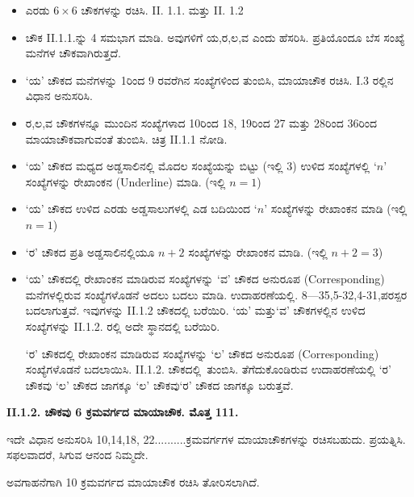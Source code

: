 \begin{itemize}
	\item ಎರಡು $6 \times 6$ ಚೌಕಗಳನ್ನು ರಚಿಸಿ. II. 1.1. ಮತ್ತು II. 1.2
	\item ಚೌಕ II.1.1.ನ್ನು 4 ಸಮಭಾಗ ಮಾಡಿ. ಅವುಗಳಿಗೆ ಯ,ರ,ಲ,ವ ಎಂದು ಹೆಸರಿಸಿ. ಪ್ರತಿಯೊಂದೂ ಬೆಸ ಸಂಖ್ಯೆ ಮನೆಗಳ ಚೌಕವಾಗಿರುತ್ತದೆ.
	\item ‘ಯ’ ಚೌಕದ ಮನೆಗಳನ್ನು 1ರಿಂದ 9 ರವರೆಗಿನ ಸಂಖ್ಯೆಗಳಿಂದ ತುಂಬಿಸಿ, ಮಾಯಾಚೌಕ ರಚಿಸಿ. I.3 ರಲ್ಲಿನ ವಿಧಾನ ಅನುಸರಿಸಿ.
	\item ರ,ಲ,ವ ಚೌಕಗಳನ್ನೂ ಮುಂದಿನ ಸಂಖ್ಯೆಗಳಾದ 10ರಿಂದ 18, 19ರಿಂದ 27 ಮತ್ತು 28ರಿಂದ 36ರಿಂದ ಮಾಯಾಚೌಕವಾಗುವಂತೆ ತುಂಬಿಸಿ. ಚಿತ್ರ II.1.1 ನೋಡಿ.
	\item ‘ಯ’ ಚೌಕದ ಮಧ್ಯದ ಅಡ್ಡಸಾಲಿನಲ್ಲಿ ಮೊದಲ ಸಂಖ್ಯೆಯನ್ನು ಬಿಟ್ಟು (ಇಲ್ಲಿ 3) ಉಳಿದ ಸಂಖ್ಯೆಗಳಲ್ಲಿ $‘n’$ ಸಂಖ್ಯೆಗಳನ್ನು ರೇಖಾಂಕನ (Underline) ಮಾಡಿ. (ಇಲ್ಲಿ $n=1$)
	\item ‘ಯ’ ಚೌಕದ ಉಳಿದ ಎರಡು ಅಡ್ಡಸಾಲುಗಳಲ್ಲಿ ಎಡ ಬದಿಯಿಂದ $‘n’$ ಸಂಖ್ಯೆಗಳನ್ನು ರೇಖಾಂಕನ ಮಾಡಿ (ಇಲ್ಲಿ $n=1$)
	\item ‘ರ’ ಚೌಕದ ಪ್ರತಿ ಅಡ್ಡಸಾಲಿನಲ್ಲಿಯೂ $n+2$ ಸಂಖ್ಯೆಗಳನ್ನು ರೇಖಾಂಕನ ಮಾಡಿ. (ಇಲ್ಲಿ $n+2=3$)
	\item ‘ಯ’ ಚೌಕದಲ್ಲಿ ರೇಖಾಂಕನ ಮಾಡಿರುವ ಸಂಖ್ಯೆಗಳನ್ನು ‘ವ’ ಚೌಕದ ಅನುರೂಪ (Corresponding) ಮನೆಗಳಲ್ಲಿರುವ ಸಂಖ್ಯೆಗಳೊಡನೆ ಅದಲು ಬದಲು ಮಾಡಿ. ಉದಾಹರಣೆಯಲ್ಲಿ. 8---35,5-32,4-31,ಪರಸ್ಪರ ಬದಲಾಗುತ್ತವೆ. ಇವುಗಳನ್ನು II.1.2 ಚೌಕದಲ್ಲಿ ಬರೆಯಿರಿ. ‘ಯ’ ಮತ್ತು‘ವ’ ಚೌಕಗಳಲ್ಲಿನ ಉಳಿದ ಸಂಖ್ಯೆಗಳನ್ನು II.1.2. ರಲ್ಲಿ ಅದೇ ಸ್ಥಾನದಲ್ಲಿ ಬರೆಯಿರಿ.

	‘ರ’ ಚೌಕದಲ್ಲಿ ರೇಖಾಂಕನ ಮಾಡಿರುವ ಸಂಖ್ಯೆಗಳನ್ನು ‘ಲ’ ಚೌಕದ ಅನುರೂಪ (Corresponding) ಸಂಖ್ಯೆಗಳೊಡನೆ ಬದಲಾಯಿಸಿ. II.1.2. \hbox{ಚೌಕದಲ್ಲಿ ತುಂಬಿಸಿ.} ತೆಗೆದುಕೊಂಡಿರುವ ಉದಾಹರಣೆಯಲ್ಲಿ ‘ರ’ ಚೌಕವು ‘ಲ’ ಚೌಕದ ಜಾಗಕ್ಕೂ ‘ಲ’ ಚೌಕ\-ವು‘ರ’ ಚೌಕದ ಜಾಗಕ್ಕೂ ಬರುತ್ತವೆ.
\end{itemize}

\textbf {II.1.2. ಚೌಕವು 6 ಕ್ರಮವರ್ಗದ ಮಾಯಾಚೌಕ. ಮೊತ್ತ 111.}

ಇದೇ ವಿಧಾನ ಅನುಸರಿಸಿ 10,14,18, 22..........ಕ್ರಮವರ್ಗಗಳ ಮಾಯಾಚೌಕ\-ಗಳನ್ನು ರಚಿಸಬಹುದು. ಪ್ರಯತ್ನಿಸಿ. ಸಫಲವಾದರೆ, ಸಿಗುವ ಆನಂದ ನಿಮ್ಮದೇ.

ಅವಗಾಹನೆಗಾಗಿ 10 ಕ್ರಮವರ್ಗದ ಮಾಯಾಚೌಕ ರಚಿಸಿ ತೋರಿಸಲಾಗಿದೆ.


